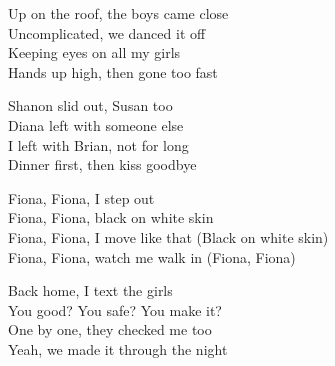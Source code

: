 \begin{lyrics}
Up on the roof, the boys came close\\
Uncomplicated, we danced it off\\
Keeping eyes on all my girls\\
Hands up high, then gone too fast

Shanon slid out, Susan too\\
Diana left with someone else\\
I left with Brian, not for long\\
Dinner first, then kiss goodbye

Fiona, Fiona, I step out\\
Fiona, Fiona, black on white skin\\
Fiona, Fiona, I move like that
(Black on white skin)\\
Fiona, Fiona, watch me walk in
(Fiona, Fiona)

Back home, I text the girls\\
You good? You safe? You make it?\\
One by one, they checked me too\\
Yeah, we made it through the night
\end{lyrics}

